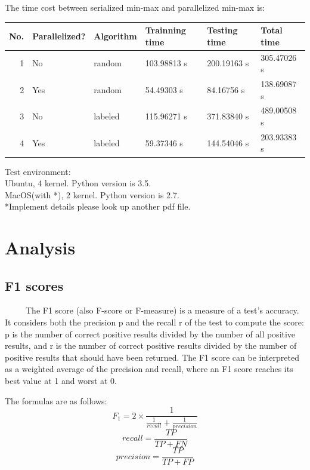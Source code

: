 \documentclass[11pt]{article}
\begin{document}
The time cost between serialized min-max and parallelized min-max is:

\begin{center}
\begin{tabular}{rlllll}
\hline
No. & Parallelized? & Algorithm & Trainning time & Testing time & Total time\\
\hline
1 & No & random & 103.98813 s & 200.19163 s & 305.47026 s\\
2 & Yes & random & 54.49303 s & 84.16756 s & 138.69087 s\\
3 & No & labeled & 115.96271 s & 371.83840 s & 489.00508 s\\
4 & Yes & labeled & 59.37346 s & 144.54046 s & 203.93383 s\\
\hline
\end{tabular}
\end{center}
Test environment:\\
Ubuntu, 4 kernel. Python version is 3.5.\\
MacOS(with *), 2 kernel. Python version is 2.7.\\
*Implement details please look up another pdf file.\\
\section{Analysis}

\subsection{F1 scores}
\label{sec-6-1}
\ \ \ \ \ The F1 score (also F-score or F-measure) is a measure of a test's accuracy. It considers both the precision p and the recall r of the test to compute the score: p is the number of correct positive results divided by the number of all positive results, and r is the number of correct positive results divided by the number of positive results that should have been returned. The F1 score can be interpreted as a weighted average of the precision and recall, where an F1 score reaches its best value at 1 and worst at 0.

The formulas are as follows:
\begin{equation}
F_1 = 2\times \frac{1}{\frac{1}{recall}+\frac{1}{precision}}
\end{equation}
\begin{equation}
recall = \frac{TP}{TP+FN}
\end{equation}
\begin{equation}
precision = \frac{TP}{TP+FP}
\end{equation}
\end{document}
